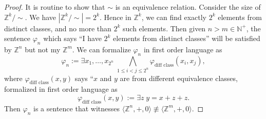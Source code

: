 \documentclass{article}
\begin{document}
\begin{enumerate}[label={\bf Q\arabic*:}]
\begin{proof}
      It is routine to show that $\sim$ is an equivalence relation.
      Consider the size of $\mathbb{Z}^k/\sim$. We have
      $|\mathbb{Z}^k/\sim|=2^k$. Hence in $\mathbb{Z}^k$, we can find
      exactly $2^k$ elements from distinct classes, and no more than $2^k$
      such elements. Then given $n>m\in\mathbb{N}^+$, the sentence
      $\varphi_n$ which says ``I have $2^k$ elements from distinct
      classes'' will be satisfied by $\mathbb{Z}^n$ but not my
      $\mathbb{Z}^m$. We can formalize $\varphi_n$ in first order language
      as
      \begin{equation*}
        \varphi_n := \exists x_1,\ldots,x_{2^n}\; \bigwedge_{1\leq
        i<j\leq2^n} \varphi_{\text{diff class}}(x_i,x_j),
      \end{equation*}
      where $\varphi_{\text{diff class}}(x,y)$ says ``$x$ and $y$ are from
      different equivalence classes, formalized in first order language as
      \begin{equation*}
        \varphi_{\text{diff class}}(x,y) := \exists z\; y=x+z+z.
      \end{equation*}
      Then $\varphi_n$ is a sentence that witnesses
      $\langle\mathbb{Z}^n,+,0\rangle\not\equiv\langle\mathbb{Z}^m,+,0\rangle$.
    \end{proof}
\end{enumerate}
\end{document}
